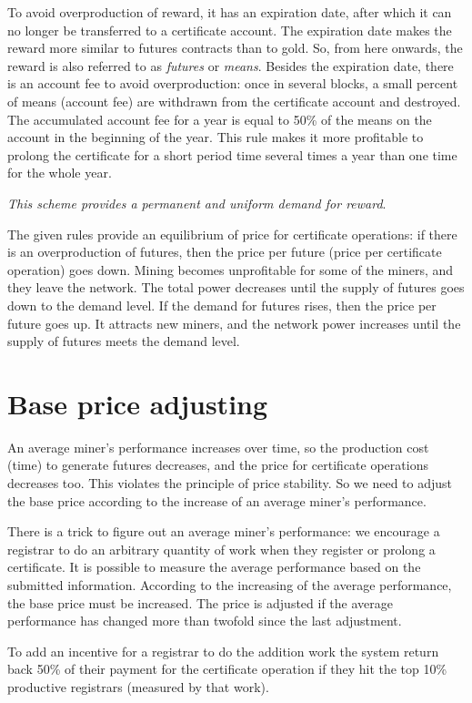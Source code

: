 \documentclass[12pt]{article}
\begin{document}
To avoid overproduction of reward, it has an expiration date, after which it can no longer be transferred to a certificate account. The expiration date makes the reward more similar to futures contracts than to gold. So, from here onwards, the reward is also referred to as \textit{futures} or \textit{means}. Besides the expiration date, there is an account fee to avoid overproduction: once in several blocks, a small percent of means (account fee) are withdrawn from the certificate account and destroyed. The accumulated account fee for a year is equal to 50\% of the means on the account in the beginning of the year. This rule makes it more profitable to prolong the certificate for a short period time several times a year than one time for the whole year.

\textit{This scheme provides a permanent and uniform demand for reward}.

The given rules provide an equilibrium of price for certificate operations: if there is an overproduction of futures, then the price per future (price per certificate operation) goes down. Mining becomes unprofitable for some of the miners, and they leave the network. The total power decreases until the supply of futures goes down to the demand level. If the demand for futures rises, then the price per future goes up. It attracts new miners, and the network power increases until the supply of futures meets the demand level.

\section{Base price adjusting}

An average miner's performance increases over time, so the production cost (time) to generate futures decreases, and the price for certificate operations decreases too. This violates the principle of price stability. So we need to adjust the base price according to the increase of an average miner's performance.

There is a trick to figure out an average miner's performance: we encourage a registrar to do an arbitrary quantity of work when they register or prolong a certificate. It is possible to measure the average performance based on the submitted information. According to the increasing of the average performance, the base price must be increased. The price is adjusted if the average performance has changed more than twofold since the last adjustment.

To add an incentive for a registrar to do the addition work the system return back 50\% of their payment for the certificate operation if they hit the top 10\% productive registrars (measured by that work).
\end{document}
